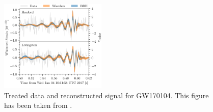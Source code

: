 \documentclass[%
reprint,
amsmath,amssymb,
aps,
]{revtex4-2}
\begin{document}
\begin{figure}[ht!]
	\includegraphics[width=0.45\textwidth]{Figures/GW170104_waveform_reconstructions.svg.png}
	\caption{Treated data and reconstructed signal for GW170104. This figure has been taken from \cite{LIGOScientific:2017bnn}.}
	\label{fig:GW170104Reconstructed}
\end{figure}
\end{document}
